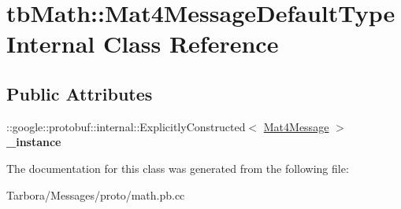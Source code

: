 \hypertarget{classtbMath_1_1Mat4MessageDefaultTypeInternal}{}\section{tb\+Math\+:\+:Mat4\+Message\+Default\+Type\+Internal Class Reference}
\label{classtbMath_1_1Mat4MessageDefaultTypeInternal}
\subsection*{Public Attributes}
\begin{DoxyCompactItemize}
\item 
\mbox{\label{classtbMath_1_1Mat4MessageDefaultTypeInternal_a26b8805ebb0b46239e5fee1fcf34ea79}} 
\+::google\+::protobuf\+::internal\+::\+Explicitly\+Constructed$<$ \hyperlink{classtbMath_1_1Mat4Message}{Mat4\+Message} $>$ {\bfseries \+\_\+instance}
\end{DoxyCompactItemize}


The documentation for this class was generated from the following file\+:\begin{DoxyCompactItemize}
\item 
Tarbora/\+Messages/proto/math.\+pb.\+cc\end{DoxyCompactItemize}
